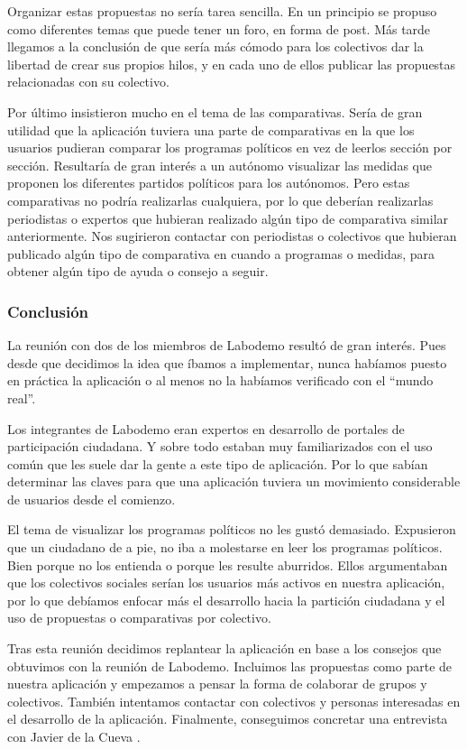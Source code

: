 Organizar estas propuestas no sería tarea sencilla. En un principio se propuso como diferentes temas que puede tener un foro, en forma de post. Más tarde llegamos a la conclusión de que sería más cómodo para los colectivos dar la libertad de crear sus propios hilos, y en cada uno de ellos publicar las propuestas relacionadas con su colectivo.

Por último insistieron mucho en el tema de las comparativas. Sería de gran utilidad que la aplicación tuviera una parte de comparativas en la que los usuarios pudieran comparar los programas políticos en vez de leerlos sección por sección. Resultaría de gran interés a un autónomo visualizar las medidas que proponen los diferentes partidos políticos para los autónomos. Pero estas comparativas no podría realizarlas cualquiera, por lo que deberían realizarlas periodistas o expertos que hubieran realizado algún tipo de comparativa similar anteriormente. Nos sugirieron contactar con periodistas o colectivos que hubieran publicado algún tipo de comparativa en cuando a programas o medidas, para obtener algún tipo de ayuda o consejo a seguir.
	
	\subsubsection{Conclusión}

La reunión con dos de los miembros de Labodemo resultó de gran interés. Pues desde que decidimos la idea que íbamos a implementar, nunca habíamos puesto en práctica la aplicación o al menos no la habíamos verificado con el “mundo real”.

Los integrantes de Labodemo eran expertos en desarrollo de portales de participación ciudadana. Y sobre todo estaban muy familiarizados con el uso común que les suele dar la gente a este tipo de aplicación. Por lo que sabían determinar las claves para que una aplicación tuviera un movimiento considerable de usuarios desde el comienzo.

El tema de visualizar los programas políticos no les gustó demasiado. Expusieron que un ciudadano de a pie, no iba a molestarse en leer los programas políticos. Bien porque no los entienda o porque les resulte aburridos. Ellos argumentaban que los colectivos sociales serían los usuarios más activos en nuestra aplicación, por lo que debíamos enfocar más el desarrollo hacia la partición ciudadana y el uso de propuestas o comparativas por colectivo.

Tras esta reunión decidimos replantear la aplicación en base a los consejos que obtuvimos con la reunión de Labodemo. Incluimos las propuestas como parte de nuestra aplicación y empezamos a pensar la forma de colaborar de grupos y colectivos. También intentamos contactar con colectivos y personas interesadas en el desarrollo de la aplicación. Finalmente, conseguimos concretar una entrevista con Javier de la Cueva \cite{ref:jdelacueva}.
	
